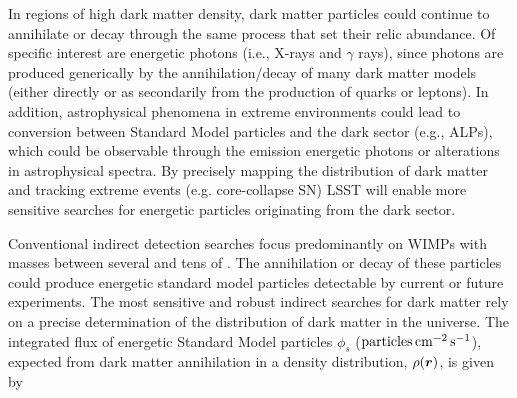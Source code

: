 In regions of high dark matter density, dark matter particles could continue to annihilate or decay through the same process that set their relic abundance.
Of specific interest are energetic photons (i.e., X-rays and $\gamma$ rays), since photons are produced generically by the annihilation/decay of many dark matter models (either directly or as secondarily from the production of quarks or leptons). In addition, astrophysical phenomena in extreme environments could lead to conversion between Standard Model particles and the dark sector (e.g., ALPs), which could be observable through the emission energetic photons or alterations in astrophysical spectra.
By precisely mapping the distribution of dark matter and tracking extreme events (e.g. core-collapse SN) LSST will enable more sensitive searches for energetic particles originating from the dark sector.

Conventional indirect detection searches focus predominantly on WIMPs with masses between several \GeV and tens of \TeV. 
The annihilation or decay of these particles could produce energetic standard model particles detectable by current or future experiments.
The most sensitive and robust indirect searches for dark matter rely on a precise determination of the distribution of dark matter in the universe.
The integrated flux of energetic Standard Model particles $\phi_s$ (${\rm particles} \mathrm{\,cm}^{-2} \mathrm{\,s}^{-1}$), expected from dark matter annihilation in a density distribution, $\rho(\boldsymbol{r})$, is given by

